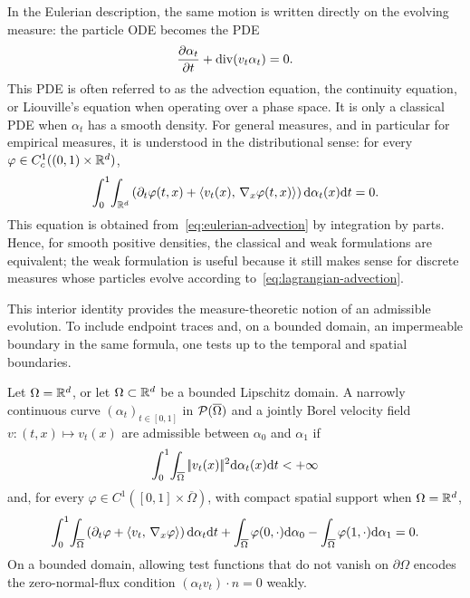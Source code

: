 In the Eulerian description, the same motion is written directly on the evolving measure: the particle ODE becomes the PDE
\begin{equation}
    \frac{\partial \alpha_t}{\partial t} + \operatorname{div}(v_t \alpha_t) = 0. \label{eq:eulerian-advection}
\end{equation}
This PDE is often referred to as the advection equation, the continuity equation, or Liouville's equation when operating over a phase space. It is only a classical PDE when $\alpha_t$ has a smooth density. For general measures, and in particular for empirical measures, it is understood in the distributional sense: for every $\varphi\in C_c^1((0,1)\times\mathbb{R}^d)$,
\begin{equation}\label{eq:eulerian-advection-weak}
	\int_0^1\!\int_{\mathbb{R}^d}
	\left(\partial_t\varphi(t,x)+\langle v_t(x),\,\nabla_x\varphi(t,x)\rangle\right)
	\mathrm{d}\alpha_t(x)\mathrm{d} t
	=
	0.
\end{equation}
This equation is obtained from~\eqref{eq:eulerian-advection} by integration by parts. Hence, for smooth positive densities, the classical and weak formulations are equivalent; the weak formulation is useful because it still makes sense for discrete measures whose particles evolve according to~\eqref{eq:lagrangian-advection}.

This interior identity provides the measure-theoretic notion of an admissible evolution. To include endpoint traces and, on a bounded domain, an impermeable boundary in the same formula, one tests up to the temporal and spatial boundaries.
\begin{defn}\label{def-admissible-continuity-evolution}
Let $\Omega=\mathbb{R}^d$, or let $\Omega\subset\mathbb{R}^d$ be a bounded Lipschitz domain. A narrowly continuous curve $(\alpha_t)_{t\in[0,1]}$ in $\mathcal{P}(\overline\Omega)$ and a jointly Borel velocity field $v:(t,x)\mapsto v_t(x)$ are admissible between $\alpha_0$ and $\alpha_1$ if
\[
\int_0^1\!\int_{\overline\Omega}|\!| v_t(x) |\!|^2\mathrm{d}\alpha_t(x)\mathrm{d} t<+\infty
\]
and, for every $\varphi\in C^1([0,1]\times\overline\Omega)$, with compact spatial support when $\Omega=\mathbb{R}^d$,
\begin{equation}\label{eq-continuity-endpoint-no-flux}
\int_0^1\!\int_{\overline\Omega}
\left(\partial_t\varphi+\langle v_t,\,\nabla_x\varphi\rangle\right)\mathrm{d}\alpha_t\mathrm{d} t
+\int_{\overline\Omega}\varphi(0,\cdot)\mathrm{d}\alpha_0
-\int_{\overline\Omega}\varphi(1,\cdot)\mathrm{d}\alpha_1=0.
\end{equation}
On a bounded domain, allowing test functions that do not vanish on $\partial\Omega$ encodes the zero-normal-flux condition $(\alpha_t v_t)\cdot n=0$ weakly.
\end{defn}

